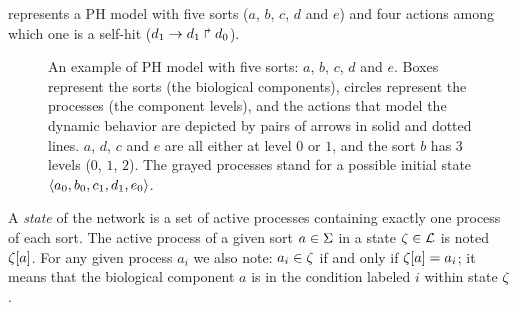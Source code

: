\begin{example}
 represents a PH model with five sorts ($a$, $b$, $c$, $d$ and $e$) and four actions among which one is a self-hit ($d_1\rightarrow d_1\Rsh d_0$).
\begin{figure}[t]
  \centering
  \caption{\label{fig:ph}
An example of PH model with five sorts: $a$, $b$, $c$, $d$ and $e$. Boxes represent the sorts (the biological components), circles represent the processes (the component levels), and the actions that model the dynamic behavior are depicted by pairs of arrows in solid and dotted lines. $a$, $d$, $c$ and $e$ are all either at level $0$ or $1$, and the sort $b$ has $3$ levels ($0$, $1$, $2$). The grayed processes stand for a possible initial state $\mbox{$\langle a_0, b_0, c_1, d_1, e_0 \rangle$}$.
  }
\end{figure}

\end{example}

A \emph{state} of the network is a set of active processes containing exactly one process of each sort.
The active process of a given sort $a \in \Sigma$ in a state $\zeta \in \mathcal{L}$
is noted ${\zeta[a]}$.
For any given process $a_i$ we also note: $a_i \in \zeta$ if and only if ${\zeta[a]} = a_i$; it means that the biological component $a$ is in the condition labeled $i$ within state $\zeta$.

